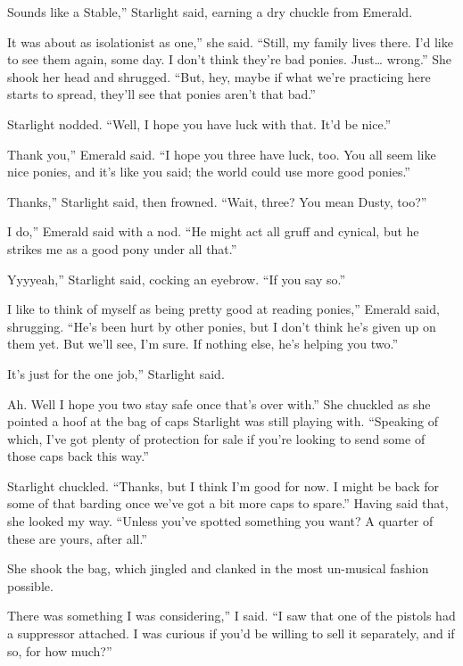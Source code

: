 \leavevmode{}Sounds like a Stable,” Starlight said, earning a dry chuckle from Emerald.

\leavevmode{}It was about as isolationist as one,” she said. “Still, my family lives there. I’d like to see them again, some day. I don’t think they’re bad ponies. Just… wrong.” She shook her head and shrugged. “But, hey, maybe if what we’re practicing here starts to spread, they’ll see that ponies aren’t that bad.”

Starlight nodded. “Well, I hope you have luck with that. It’d be nice.”

\leavevmode{}Thank you,” Emerald said. “I hope you three have luck, too. You all seem like nice ponies, and it’s like you said; the world could use more good ponies.”

\leavevmode{}Thanks,” Starlight said, then frowned. “Wait, three? You mean Dusty, too?”

\leavevmode{}I do,” Emerald said with a nod. “He might act all gruff and cynical, but he strikes me as a good pony under all that.”

\leavevmode{}Yyyyeah,” Starlight said, cocking an eyebrow. “If you say so.”

\leavevmode{}I like to think of myself as being pretty good at reading ponies,” Emerald said, shrugging. “He’s been hurt by other ponies, but I don’t think he’s given up on them yet. But we’ll see, I’m sure. If nothing else, he’s helping you two.”

\leavevmode{}It’s just for the one job,” Starlight said.

\leavevmode{}Ah. Well I hope you two stay safe once that’s over with.” She chuckled as she pointed a hoof at the bag of caps Starlight was still playing with. “Speaking of which, I’ve got plenty of protection for sale if you’re looking to send some of those caps back this way.”

Starlight chuckled. “Thanks, but I think I’m good for now. I might be back for some of that barding once we’ve got a bit more caps to spare.” Having said that, she looked my way. “Unless you’ve spotted something you want? A quarter of these are yours, after all.”

She shook the bag, which jingled and clanked in the most un-musical fashion possible.

\leavevmode{}There was something I was considering,” I said. “I saw that one of the pistols had a suppressor attached. I was curious if you’d be willing to sell it separately, and if so, for how much?”

